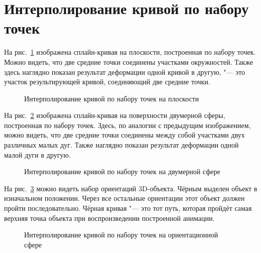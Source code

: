 \section{Интерполирование кривой по набору точек}

На рис.~\ref{picture-by-points-plane} изображена сплайн-кривая на плоскости, построенная по набору точек. Можно видеть,
что две средние точки соединены участками окружностей. Также здесь наглядно показан результат деформации одной кривой
в другую, "--- это участок результирующей кривой, соединяющий две средние точки.

\begin{figure}[h!]
\caption{Интерполирование кривой по набору точек на плоскости}
\label{picture-by-points-plane}
\end{figure}

На рис.~\ref{picture-by-points-two-dimension} изображена сплайн-кривая на поверхности двумерной сферы, построенная
по набору точек. Здесь, по аналогии с предыдущим изображением, можно видеть, что две средние точки соединены между собой
участками двух различных малых дуг. Также наглядно показан результат деформации одной малой дуги в другую.

\begin{figure}[h!]
\caption{Интерполирование кривой по набору точек на двумерной сфере}
\label{picture-by-points-two-dimension}
\end{figure}

На рис.~\ref{picture-by-points-orientation} можно видеть набор ориентаций 3D-объекта. Чёрным выделен объект
в изначальном положении. Через все остальные ориентации этот объект должен пройти последовательно. Чёрная
кривая "--- это тот путь, которая пройдёт самая верхняя точка объекта при воспроизведении построенной анимации.

\begin{figure}[h!]
\caption{Интерполирование кривой по набору точек на ориентационной сфере}
\label{picture-by-points-orientation}
\end{figure}
